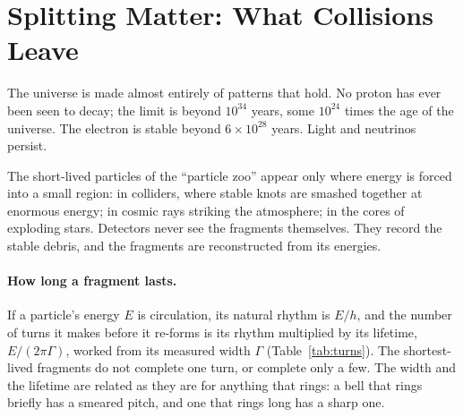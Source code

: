 \documentclass[11pt,a4paper]{article}
\begin{document}
\section{Splitting Matter: What Collisions Leave}
\label{sec:fragments}

 The universe is made almost entirely of patterns that hold. No proton has ever been seen to decay; the limit is beyond $10^{34}$ years, some $10^{24}$ times the age of the universe. The electron is stable beyond $6\times10^{28}$ years. Light and neutrinos persist.

The short-lived particles of the ``particle zoo'' appear only where energy is forced into a small region: in colliders, where stable knots are smashed together at enormous energy; in cosmic rays striking the atmosphere; in the cores of exploding stars.  Detectors never see the fragments themselves. They record the stable debris, and the fragments are reconstructed from its energies.

\paragraph{How long a fragment lasts.} If a particle's energy $E$ is circulation, its natural rhythm is $E/h$, and the number of turns it makes before it re-forms is its rhythm multiplied by its lifetime, $E/(2\pi\Gamma)$, worked from its measured width $\Gamma$ (Table~\ref{tab:turns}). The shortest-lived fragments do not complete one turn, or complete only a few. The width and the lifetime are related as they are for anything that rings: a bell that rings briefly has a smeared pitch, and one that rings long has a sharp one.
\end{document}
